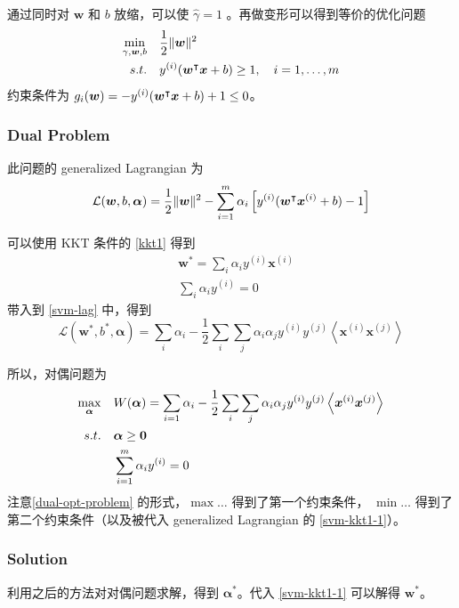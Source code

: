		通过同时对 $ \bm{w} $ 和 $ b $ 放缩，可以使 $ \hat{\gamma} = 1 $ 。再做变形可以得到等价的优化问题
		\begin{align}
			\min_{\gamma, \bm{w}, b}\quad & \frac{1}{2} \| \bm{w} \| ^2 \\
			s.t. \quad & y^{(i)} (\bm{w^}\intercal \bm{x} + b) \geq 1, \quad i = 1, \ldots, m
		\end{align}
		约束条件为 $ g_i(\bm{w}) = -y^{(i)} (\bm{w^}\intercal \bm{x} + b) + 1 \leq 0 $。
		
		\subsubsection{Dual Problem}
		此问题的 generalized Lagrangian 为
		\begin{equation}
			\mathcal{L}(\bm{w}, b, \bm{\alpha}) = \frac{1}{2} \| \bm{w} \| ^2 - \sum_{i=1}^m \alpha_i \left[ y^{(i)} (\bm{w^}\intercal \bm{x}^{(i)} + b) - 1 \right] \label{svm-lag}
		\end{equation}
		
		可以使用 KKT 条件的 \eqref{kkt1} 得到
		\begin{align}
			&\bm{w}^* = \sum_i{\alpha_i y^{(i)} \bm{x}^{(i)}} \label{svm-kkt1-1} \\ 
			&\sum_i{\alpha_i y^{(i)}} = 0 \label{svm-kkt1-2}
		\end{align}
		带入到 \eqref{svm-lag} 中，得到
		\begin{equation*}
			\mathcal{L}(\bm{w}^*, b^*, \bm{\alpha}) = \sum_i{\alpha_i} - \frac{1}{2} \sum_i \sum_j {\alpha_i \alpha_j y^{(i)} y^{(j)} \left\langle \bm{x}^{(i)} \bm{x}^{(j)} \right\rangle }
		\end{equation*}
		
		所以，对偶问题为
		\begin{align}
			\max_{\bm{\alpha}} \quad & W(\bm{\alpha}) = \sum_{i=1}{\alpha_i} - \frac{1}{2} \sum_i \sum_j {\alpha_i \alpha_j y^{(i)} y^{(j)} \left\langle \bm{x}^{(i)} \bm{x}^{(j)} \right\rangle } \\
			s.t. \quad & \bm{\alpha} \geq \bm{0} \\
			& \sum_{i=1}^{m} \alpha_i y^{(i)} = 0
		\end{align}
		注意\eqref{dual-opt-problem} 的形式，$ \max \ldots $ 得到了第一个约束条件，
		$ \min \ldots $ 得到了第二个约束条件（以及被代入 generalized Lagrangian 的 \eqref{svm-kkt1-1}）。
		
		\subsubsection{Solution}
		利用之后的方法对对偶问题求解，得到 $ \bm{\alpha}^* $。代入 \eqref{svm-kkt1-1} 可以解得 $ \bm{w}^* $。
		
